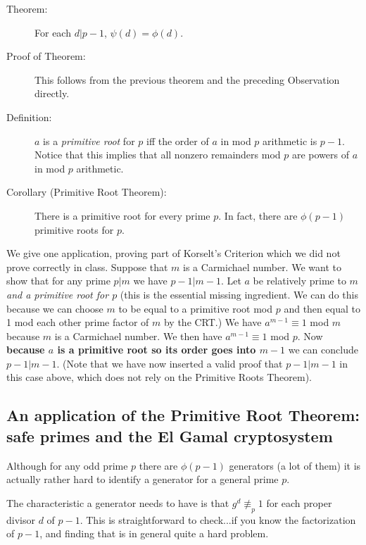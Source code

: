 \documentclass[12pt]{article}
\begin{document}
\begin{description}
\item[Theorem:]   For each $d|p-1$, $\psi(d)=\phi(d)$.

\item[Proof of Theorem:]   This follows from the previous theorem and the preceding Observation directly.

\item[Definition:]  $a$ is a {\em primitive root\/} for $p$ iff the order of $a$ in mod $p$ arithmetic is $p-1$.   Notice that this implies that all nonzero remainders mod $p$ are powers of $a$ in mod $p$ arithmetic.

\item[Corollary (Primitive Root Theorem):]  There is a primitive root for every prime $p$.  In fact, there are $\phi(p-1)$ primitive roots for $p$.




\end{description}

We give one application, proving part of Korselt's Criterion which we did not prove correctly in class.   Suppose that $m$ is a Carmichael number.   We want to show that for any prime $p|m$ we have $p-1|m-1$.
Let $a$ be relatively prime to $m$ {\em and a primitive root for $p$\/} (this is the essential missing ingredient.   We can do this because we can choose $m$ to be equal to a primitive root mod $p$ and then
equal to 1 mod each other prime factor of $m$ by the CRT.)  We have $a^{m-1}\equiv 1$ mod $m$ because $m$ is a Carmichael number.  We then have $a^{m-1}\equiv 1$ mod $p$.  Now {\bf because $a$ is a primitive root so its order goes into $m-1$}
we can conclude $p-1|m-1$.  (Note that we have now inserted a valid proof that $p-1|m-1$ in this case above, which does not rely on the Primitive Roots Theorem).

\subsection{An application of the Primitive Root Theorem:  safe primes and the El Gamal cryptosystem}

Although for any odd prime $p$ there are $\phi(p-1)$ generators (a lot of them) it is actually rather hard to identify a generator for a general prime $p$.

The characteristic a generator needs to have is that $g^d \not\equiv_p 1$ for each proper divisor $d$ of $p-1$.  This is straightforward to check...if you know the factorization of $p-1$, and finding that is in general quite a hard problem.
\end{document}

